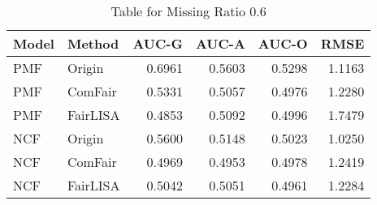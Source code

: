 \begin{table}
\centering
\caption{Table for Missing Ratio 0.6}
\label{tab:missing_0.6}
\begin{tabular}{llrrrr}
\toprule
Model &   Method &  AUC-G &  AUC-A &  AUC-O &   RMSE \\
\midrule
  PMF &   Origin & 0.6961 & 0.5603 & 0.5298 & 1.1163 \\
  PMF &  ComFair & 0.5331 & 0.5057 & 0.4976 & 1.2280 \\
  PMF & FairLISA & 0.4853 & 0.5092 & 0.4996 & 1.7479 \\
  NCF &   Origin & 0.5600 & 0.5148 & 0.5023 & 1.0250 \\
  NCF &  ComFair & 0.4969 & 0.4953 & 0.4978 & 1.2419 \\
  NCF & FairLISA & 0.5042 & 0.5051 & 0.4961 & 1.2284 \\
\bottomrule
\end{tabular}
\end{table}
